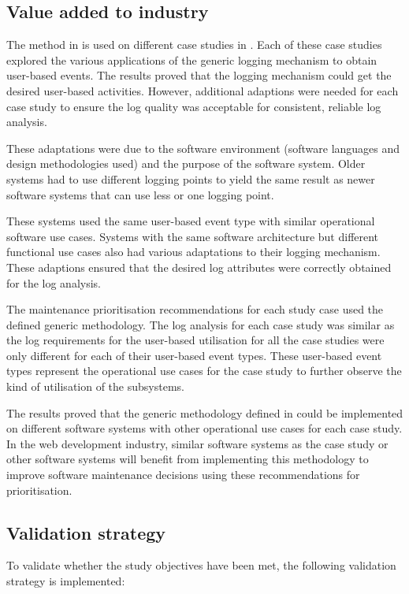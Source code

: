 \subsection{Value added to industry}
The method in  is used on different case studies in . Each of these case studies explored the various applications of the generic logging mechanism to obtain user-based events. The results proved that the logging mechanism could get the desired user-based activities. However, additional adaptions were needed for each case study to ensure the log quality was acceptable for consistent, reliable log analysis.\par These adaptations were due to the software environment (software languages and design methodologies used) and the purpose of the software system. Older systems had to use different logging points to yield the same result as newer software systems that can use less or one logging point.\par These systems used the same user-based event type with similar operational software use cases. Systems with the same software architecture but different functional use cases also had various adaptations to their logging mechanism. These adaptions ensured that the desired log attributes were correctly obtained for the log analysis. \par The maintenance prioritisation recommendations for each study case used the defined generic methodology. The log analysis for each case study was similar as the log requirements for the user-based utilisation for all the case studies were only different for each of their user-based event types. These user-based event types represent the operational use cases for the case study to further observe the kind of utilisation of the subsystems. \par The results proved that the generic methodology defined in  could be implemented on different software systems with other operational use cases for each case study. In the web development industry, similar software systems as the case study or other software systems will benefit from implementing this methodology to improve software maintenance decisions using these recommendations for prioritisation.

\subsection{Validation strategy}
To validate whether the study objectives have been met, the following validation strategy is implemented:

